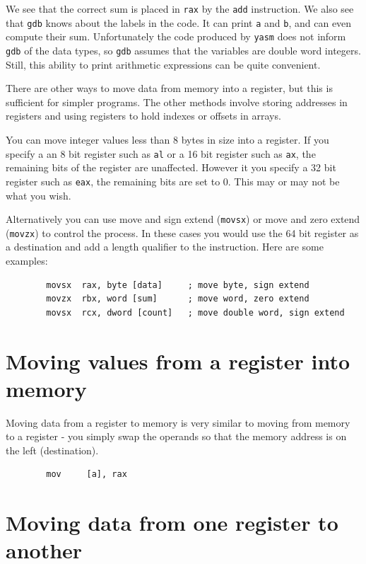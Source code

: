 \documentclass[11pt,b5paper]{book}
\begin{document}
We see that the correct sum is placed in {\tt rax} by the {\tt add}
instruction.
We also see that {\tt gdb} knows about the labels in the code.
It can print {\tt a} and {\tt b}, and can even compute their sum.
Unfortunately the code produced by {\tt yasm} does not inform {\tt gdb}
of the data types, so {\tt gdb} assumes that the variables are double word
integers.
Still, this ability to print arithmetic expressions can be quite convenient.

There are other ways to move data from memory into a register, but this
is sufficient for simpler programs.
The other methods involve storing addresses in registers and using registers
to hold indexes or offsets in arrays.

You can move integer values less than 8 bytes in size into a register.
If you specify a an 8 bit register such as {\tt al} or a 16 bit register such as
{\tt ax}, the remaining bits of the register are unaffected.
However it you specify a 32 bit register such as {\tt eax}, the remaining bits are set to 0.
This may or may not be what you wish.

Alternatively you can use move and sign extend ({\tt movsx}) or move and zero extend ({\tt movzx})  
to control the process. In these cases you would use the 64 bit register as a destination and
add a length qualifier to the instruction.  Here are some examples:

\begin{verbatim}
        movsx  rax, byte [data]     ; move byte, sign extend
        movzx  rbx, word [sum]      ; move word, zero extend
        movsx  rcx, dword [count]   ; move double word, sign extend
\end{verbatim}



\section{Moving values from a register into memory}

Moving data from a register to memory is very similar to moving from memory to 
a register - you simply swap the operands so that the memory address is on the
left (destination).
\begin{verbatim}
        mov     [a], rax
\end{verbatim}

\section{Moving data from one register to another}
\end{document}
